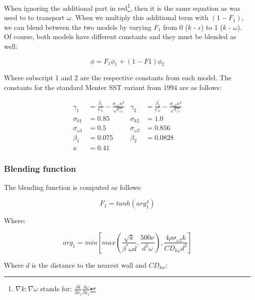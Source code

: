 \noindent When ignoring the additional part in red\footnote{$\nabla k : \nabla
\omega$ stands for: $\frac{\partial k}{\partial x_j} \frac{\partial
\omega}{\partial x_j}$}, then it is the same equation as was used to to
transport $\omega$. When we multiply this additional term with $(1 - F_1)$, we
can blend between the two models by varying $F_1$ from 0 ($k$ - $\epsilon$) to
1 ($k$ - $\omega$). Of course, both models have different constants and they
must be blended as well:

\begin{equation}
    \phi = F_1 \phi_1 + (1 - F1) \phi_2
\end{equation}

\noindent Where subscript 1 and 2 are the respective constants from each model.
The constants for the standard Menter SST variant from 1994  are as follows:
\cite{nasatmr}

\begin{align*}
    \gamma_1 &= \frac{\beta_1}{C_{\nu}} - 
    \frac{\sigma_{\omega 1} \kappa^2}{\sqrt{C_{\nu}}}
    & \gamma_2 &= \frac{\beta_2}{C_{\nu}} - 
    \frac{\sigma_{\omega 2} \kappa^2}{\sqrt{C_{\nu}}}\\
%
    \sigma_{k 1}        &= 0.85  & \sigma_{k 2}         &= 1.0 \\
    \sigma_{\omega 1}   &= 0.5   & \sigma_{\omega 2}    &= 0.856 \\
    \beta_1             &= 0.075 & \beta_2              &= 0.0828 \\
    \kappa              &= 0.41
\end{align*}


\subsubsection{Blending function}
The blending function is computed as follows:

\begin{equation}
    \label{eq:f1}
    F_1 = tanh(arg_1^4)
\end{equation}

\noindent Where:

\begin{equation}
    \label{eq:arg1}
    arg_1 = min \left[ max \left( 
    \frac{\sqrt{k}}{\beta^{*} \omega d}, \frac{500 \nu}{d^2 \omega}
    \right), 
    \frac{4 \rho \sigma_{\omega 2} k}{CD_{k \omega} d^2}
    \right]
\end{equation}

\noindent Where $d$ is the distance to the nearest wall and $CD_{kw}$:

